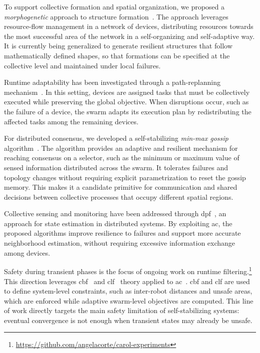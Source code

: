 \documentclass[conference]{IEEEtran}
\begin{document}
To support collective formation and spatial organization,
we proposed a \emph{morphogenetic} approach to structure formation~\cite{DBLP:journals/comintsys/CortecchiaCCP26,DBLP:conf/acsos/CortecchiaPCC24}.
%
The approach leverages resource-flow management in a network of devices,
distributing resources towards the most successful area of the network in a self-organizing and self-adaptive way.
%
It is currently being generalized to generate resilient structures that follow mathematically defined shapes,
so that formations can be specified at the collective level and maintained under local failures.

Runtime adaptability has been investigated through a path-replanning mechanism~\cite{DBLP:conf/acsos/AguzziBCMPPV25}.
%
In this setting,
devices are assigned tasks that must be collectively executed while preserving the global objective.
%
When disruptions occur,
such as the failure of a device,
the swarm adapts its execution plan by redistributing the affected tasks among the remaining devices.

For distributed consensus,
we developed a self-stabilizing \emph{min-max gossip} algorithm~\cite{DBLP:conf/coordination/CortecchiaPV26}.
%
The algorithm provides an adaptive and resilient mechanism for reaching consensus on a selector,
such as the minimum or maximum value of sensed information distributed across the swarm.
%
It tolerates failures and topology changes without requiring explicit parametrization to reset the gossip memory.
%
This makes it a candidate primitive for communication and shared decisions between collective processes that occupy different spatial regions.

Collective sensing and monitoring have been addressed through \ac{dpf}~\cite{DBLP:conf/acsos/CortecchiaDCCV26},
an approach for state estimation in distributed systems.
%
By exploiting \ac{ac},
the proposed algorithms improve resilience to failures and support more accurate neighborhood estimation,
without requiring excessive information exchange among devices.

Safety during transient phases is the focus of ongoing work on runtime filtering.\footnote{\url{https://github.com/angelacorte/carol-experiments}}
%
This direction leverages \ac{cbf}~\cite{DBLP:conf/eucc/AmesCENST19} and \ac{clf}~\cite{DBLP:journals/ieeejas/LiWYWH23} theory applied to \ac{ac}~\cite{DBLP:conf/acsos/CortecchiaPD26}.
%
\ac{cbf} and \ac{clf} are used to define system-level constraints,
such as inter-robot distances and unsafe areas,
which are enforced while adaptive swarm-level objectives are computed.
%
This line of work directly targets the main safety limitation of self-stabilizing systems:
eventual convergence is not enough when transient states may already be unsafe.
\end{document}
